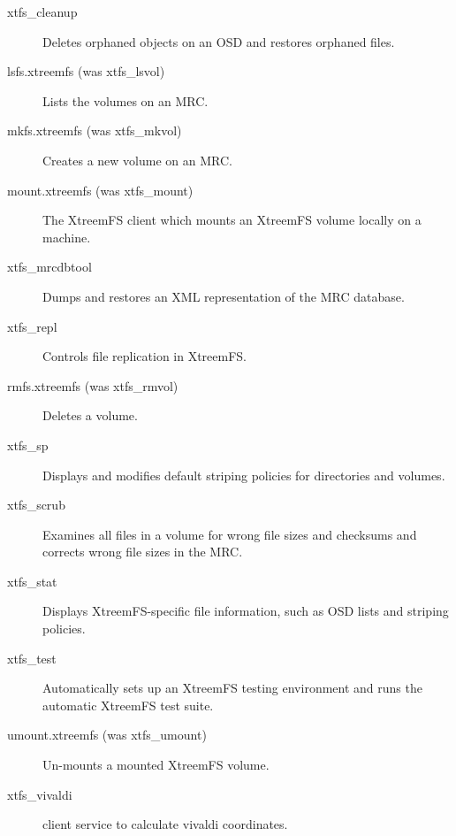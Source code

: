 \documentclass[a4paper,10pt]{book}
\begin{document}
\begin{description}
 \item[xtfs\_cleanup] Deletes orphaned objects on an OSD and restores orphaned files.
 \item[lsfs.xtreemfs (was xtfs\_lsvol)] Lists the volumes on an MRC.
 \item[mkfs.xtreemfs (was xtfs\_mkvol)] Creates a new volume on an MRC.
 \item[mount.xtreemfs (was xtfs\_mount)] The XtreemFS client which mounts an XtreemFS volume locally on a machine.
 \item[xtfs\_mrcdbtool] Dumps and restores an XML representation of the MRC database.
 \item[xtfs\_repl] Controls file replication in XtreemFS.
 \item[rmfs.xtreemfs (was xtfs\_rmvol)] Deletes a volume.
 \item[xtfs\_sp] Displays and modifies default striping policies for directories and volumes.
 \item[xtfs\_scrub] Examines all files in a volume for wrong file sizes and checksums and corrects wrong file sizes in the MRC.
 \item[xtfs\_stat] Displays XtreemFS-specific file information, such as OSD lists and striping policies.
 \item[xtfs\_test] Automatically sets up an XtreemFS testing environment and runs the automatic XtreemFS test suite.
 \item[umount.xtreemfs (was xtfs\_umount)] Un-mounts a mounted XtreemFS volume.
 \item[xtfs\_vivaldi] client service to calculate vivaldi coordinates.
\end{description}

\printindex
\end{document}
